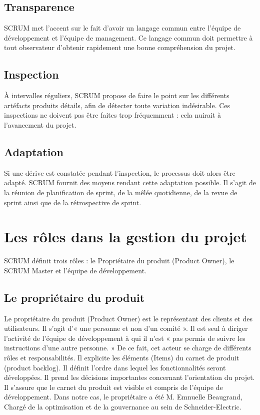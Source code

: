 \documentclass[a4paper,12pt]{book}
\theoremstyle{break}
\begin{document}
\subsection{Transparence}
SCRUM met l'accent sur le fait d'avoir un langage commun entre l'équipe de développement et l’équipe de management. Ce langage commun doit permettre à tout observateur d'obtenir rapidement une bonne compréhension du projet. 

\subsection{Inspection}
À intervalles réguliers, SCRUM propose de faire le point sur les différents artéfacts produits détails, afin de détecter toute variation indésirable. Ces inspections ne doivent pas être faites trop fréquemment : cela nuirait à l'avancement du projet.


\subsection{Adaptation}
Si une dérive est constatée pendant l'inspection, le processus doit alors être adapté. SCRUM fournit des moyens rendant cette adaptation possible. Il s'agit de la réunion de planification de sprint, de la mêlée quotidienne, de la revue de sprint ainsi que de la rétrospective de sprint.

\section{Les rôles dans la gestion du projet}
SCRUM définit trois rôles : le Propriétaire du produit (Product Owner), le SCRUM Master et l’équipe de développement.

\subsection{Le propriétaire du produit}
Le propriétaire du produit (Product Owner) est le représentant des clients et des utilisateurs. Il s'agit d'« une personne et non d'un comité ». Il est seul à diriger l'activité de l'équipe de développement à qui il n'est « pas permis de suivre les instructions d'une autre personne. »
De ce fait, cet acteur se charge de différents rôles et responsabilités. Il explicite les éléments (Items) du carnet de produit (product backlog). Il définit l'ordre dans lequel les fonctionnalités seront développées. Il prend les décisions importantes concernant l'orientation du projet. Il s'assure que le carnet du produit est visible et compris de l'équipe de développement.
Dans notre cas, le propriétaire a été M. Emnuelle Beaugrand, Chargé de la optimisation et de la gouvernance au sein de Schneider-Electric.
\end{document}
